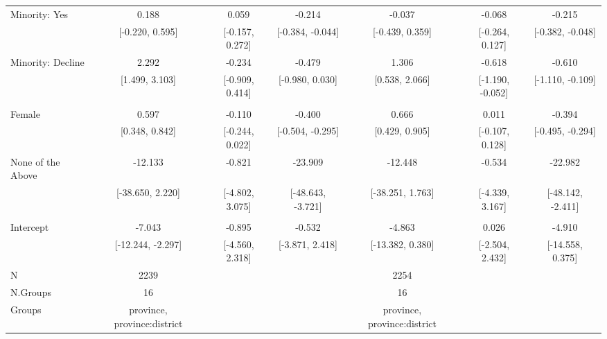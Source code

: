 \documentclass[
  10,
  letterpaper,
  DIV=11,
  numbers=noendperiod]{scrartcl}
\begin{document}
\begin{table}
\begin{tabular}[t]{lcccccc}
\hspace{1em}Minority: Yes & 0.188 & 0.059 & -0.214 & -0.037 & -0.068 & -0.215\\
\hspace{1em} & {}[-0.220, 0.595] & {}[-0.157, 0.272] & {}[-0.384, -0.044] & {}[-0.439, 0.359] & {}[-0.264, 0.127] & {}[-0.382, -0.048]\\
\hspace{1em}Minority: Decline & 2.292 & -0.234 & -0.479 & 1.306 & -0.618 & -0.610\\
\hspace{1em} & {}[1.499, 3.103] & {}[-0.909, 0.414] & {}[-0.980, 0.030] & {}[0.538, 2.066] & {}[-1.190, -0.052] & {}[-1.110, -0.109]\\
\addlinespace[0.3em]
\multicolumn{7}{l}{\cellcolor[HTML]{3498DB}{\textbf{Gender}}}\\
\hspace{1em}Female & 0.597 & -0.110 & -0.400 & 0.666 & 0.011 & -0.394\\
\hspace{1em} & {}[0.348, 0.842] & {}[-0.244, 0.022] & {}[-0.504, -0.295] & {}[0.429, 0.905] & {}[-0.107, 0.128] & {}[-0.495, -0.294]\\
\hspace{1em}None of the Above & -12.133 & -0.821 & -23.909 & -12.448 & -0.534 & -22.982\\
\hspace{1em} & {}[-38.650, 2.220] & {}[-4.802, 3.075] & {}[-48.643, -3.721] & {}[-38.251, 1.763] & {}[-4.339, 3.167] & {}[-48.142, -2.411]\\
\addlinespace[0.3em]
\multicolumn{7}{l}{\cellcolor[HTML]{3498DB}{\textbf{Intercept}}}\\
\hspace{1em}Intercept & -7.043 & -0.895 & -0.532 & -4.863 & 0.026 & -4.910\\
\hspace{1em} & {}[-12.244, -2.297] & {}[-4.560, 2.318] & {}[-3.871, 2.418] & {}[-13.382, 0.380] & {}[-2.504, 2.432] & {}[-14.558, 0.375]\\
\midrule
N & 2239 &  &  & 2254 &  & \\
N.Groups & 16 &  &  & 16 &  & \\
Groups & province, province:district &  &  & province, province:district &  & \\
\bottomrule
\end{tabular}
\end{table}
\end{document}

